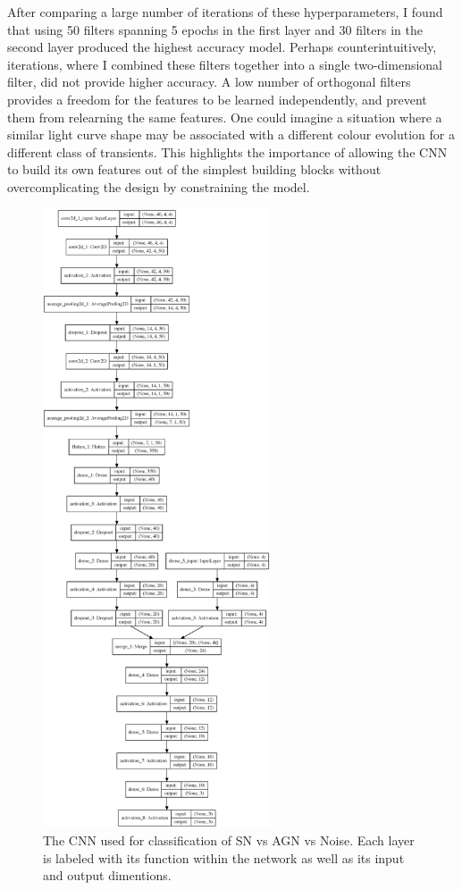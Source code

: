 After comparing a large number of iterations of these hyperparameters, I found that using 50 filters spanning 5 epochs in the first layer and 30 filters in the second layer produced the highest accuracy model. Perhaps counterintuitively, iterations, where I combined these filters together into a single two-dimensional filter, did not provide higher accuracy. A low number of orthogonal filters provides a freedom for the features to be learned independently, and prevent them from relearning the same features. One could imagine a situation where a similar light curve shape may be associated with a different colour evolution for a different class of transients. This highlights the importance of allowing the CNN to build its own features out of the simplest building blocks without overcomplicating the design by constraining the model.

\begin{figure}
  \centering
  \includegraphics[width=0.6\textwidth]{Figures/Chapter5/SNAGNNoise}
  \caption{The CNN used for classification of SN vs AGN vs Noise. Each layer is labeled with its function within the network as well as its input and output dimentions.}
  \label{fig:AGNNoiseSNModel}
\end{figure}

